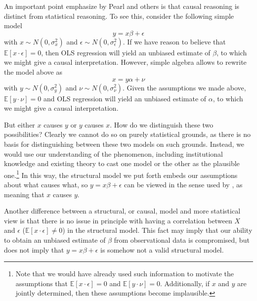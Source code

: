 \documentclass[11pt,reqno]{amsart}
\begin{document}
\begin{doublespace}
An important point emphasize by Pearl and others is that causal reasoning is distinct from statistical reasoning.
To see this, consider the following simple model
\[ y = x \beta + \epsilon \]
with $x \sim N(0, \sigma_x^2)$ and $\epsilon  \sim N(0, \sigma_{\epsilon}^2)$.
If we have reason to believe that $\mathbb{E}[x \cdot \epsilon] = 0$, then OLS regression will yield an unbiased estimate of $\beta$, to which we might give a causal interpretation.
However, simple algebra allows to rewrite the model above as 
\[ x = y \alpha + \nu \]
with $y \sim N(0, \sigma_y^2)$ and $\nu  \sim N(0, \sigma_{\nu}^2)$.
Given the assumptions we made above, $\mathbb{E}[y \cdot \nu] = 0$ and OLS regression will yield an unbiased estimate of $\alpha$, to which we might give a causal interpretation.

But either $x$ causes $y$ or $y$ causes $x$. 
How do we distinguish these two possibilities?
Clearly we cannot do so on purely statistical grounds, as there is no basis for distinguishing between these two models on such grounds.
Instead, we would use our understanding of the phenomenon, including institutional knowledge and existing theory to cast one model or the other as the plausible one.\footnote{
Note that we would have already used such information to motivate the assumptions that $\mathbb{E}[x \cdot \epsilon] = 0$ and $\mathbb{E}[y \cdot \nu] = 0$.
Additionally, if $x$ and $y$ are jointly determined, then these assumptions become implausible.}
In this way, the structural model we put forth embeds our assumptions about what causes what, so $y = x \beta + \epsilon$ can be viewed in the sense used by \citet[p.979]{Goldberger:1972cq}, as meaning that $x$ causes $y$.

Another difference between a structural, or causal, model and more statistical view is that there is no issue in principle with having a correlation between $X$ and $\epsilon$ ($\mathbb{E} [x \cdot \epsilon] \neq 0$) in the structural model.
This fact may imply that our ability to obtain an unbiased estimate of $\beta$ from observational data is compromised, but does not imply that $y = x \beta + \epsilon$ is somehow not a valid structural model.


\end{doublespace}
\end{document}

